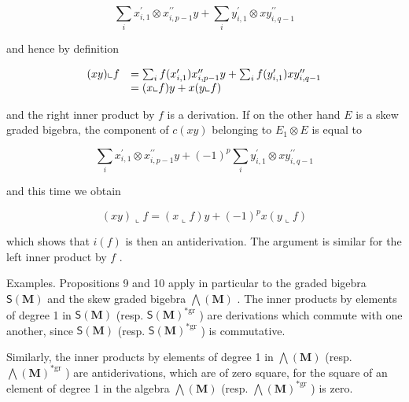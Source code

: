 \[
\sum_ {i} x _ {i, 1} ^ {\prime} \otimes x _ {i, p - 1} ^ {\prime \prime} y + \sum_ {i} y _ {i, 1} ^ {\prime} \otimes x y _ {i, q - 1} ^ {\prime \prime}
\]

and hence by definition

\[
\begin{array}{r l} (x y) \llcorner f & = \sum_ {i} f (x _ {i, 1} ^ {\prime}) x _ {i, p - 1} ^ {\prime \prime} y + \sum_ {i} f (y _ {i, 1} ^ {\prime}) x y _ {i, q - 1} ^ {\prime \prime} \\ & = (x \llcorner f) y + x (y \llcorner f) \end{array}
\]

and the right inner product by \(f\) is a derivation. If on the other hand \(E\) is a skew graded bigebra, the component of \(c(xy)\) belonging to \(E_1 \otimes E\) is equal to

\[
\sum_ {i} x _ {i, 1} ^ {\prime} \otimes x _ {i, p - 1} ^ {\prime \prime} y + (- 1) ^ {p} \sum_ {i} y _ {i, 1} ^ {\prime} \otimes x y _ {i, q - 1} ^ {\prime \prime}
\]

and this time we obtain

\[
(x y) \llcorner f = (x \llcorner f) y + (- 1) ^ {p} x (y \llcorner f)
\]

which shows that \(i(f)\) is then an antiderivation. The argument is similar for the left inner product by \(f\) .

Examples. Propositions 9 and 10 apply in particular to the graded bigebra \(\mathsf{S}(\mathbf{M})\) and the skew graded bigebra \(\bigwedge (\mathbf{M})\) . The inner products by elements of degree 1 in \(\mathsf{S}(\mathbf{M})\) (resp. \(\mathsf{S}(\mathbf{M})^{*\mathrm{gr}}\) ) are derivations which commute with one another, since \(\mathsf{S}(\mathbf{M})\) (resp. \(\mathsf{S}(\mathbf{M})^{*\mathrm{gr}}\) ) is commutative.

Similarly, the inner products by elements of degree 1 in \(\bigwedge (\mathbf{M})\) (resp. \(\bigwedge (\mathbf{M})^{*\mathrm{gr}}\) ) are antiderivations, which are of zero square, for the square of an element of degree 1 in the algebra \(\bigwedge (\mathbf{M})\) (resp. \(\bigwedge (\mathbf{M})^{*\mathrm{gr}}\) ) is zero.

